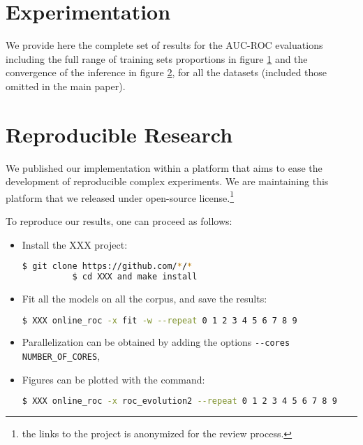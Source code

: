 \section{Experimentation}

We provide here the complete set of results for the AUC-ROC evaluations including the full range of training sets proportions  in figure \ref{fig:roc}  and the convergence of the inference in figure \ref{fig:conv_entropy}, for all the datasets (included those omitted in the main paper).

\begin{figure}[h]
\centering
	
   \label{fig:roc}
\end{figure}


\begin{figure}[h]
\centering
	
    \label{fig:conv_entropy}
\end{figure}

\section{Reproducible Research}

We published our implementation within a platform that aims to ease the development of reproducible complex experiments. We are maintaining this platform that we released under open-source license.\footnote{the links to the project is anonymized for the review process.}

To reproduce our results, one can proceed as follows:
\begin{itemize}
\item Install the XXX project:   %
    \begin{lstlisting}[language=bash]
          $ git clone https://github.com/*/*
          $ cd XXX and make install
    \end{lstlisting}
\item Fit all the models on all the corpus, and save the results:
\begin{lstlisting}[language=bash]
        $ XXX online_roc -x fit -w --repeat 0 1 2 3 4 5 6 7 8 9 
\end{lstlisting}
\item Parallelization can be obtained by adding the options \lstinline|--cores NUMBER_OF_CORES|,
\item Figures can be plotted with the command:  
\begin{lstlisting}[language=bash]
        $ XXX online_roc -x roc_evolution2 --repeat 0 1 2 3 4 5 6 7 8 9
\end{lstlisting}
\end{itemize}

